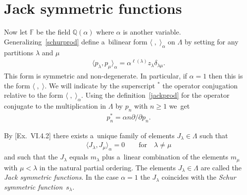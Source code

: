 \documentclass[pdftex]{sigma}
\numberwithin{equation}{section}
\renewcommand\ge{\geqslant}
\begin{document}
\section{Jack symmetric functions}\label{Section5}

Now let $\mathbb F$ be the f\/ield $\mathbb Q(\alpha)$ where $\alpha$ is another variable.
Generalizing~\eqref{schurprod} def\/ine a~bilinear form $\langle\;,\;\rangle_\alpha$ on $\Lambda$
by setting for any partitions $\lambda$ and $\mu$
\begin{gather}
\label{jackprod}
\langle p_\lambda,p_\mu\rangle_\alpha=\alpha^{\ell(\lambda)}
z_\lambda\delta_{\lambda\mu}.
\end{gather}
This form is symmetric and non-degenerate.
In particular, if $\alpha=1$ then this is the form $\langle\;,\; \rangle$.
We will indicate by the superscript ${}^\ast$ the operator conjugation relative to the form
$\langle\;,\;\rangle_\alpha$.
Using the def\/inition~\eqref{jackprod} for the operator conjugate to the multiplication in $\Lambda$ by
$p_n$ with $n\ge1$ we~get
\begin{gather}
\label{pnast}
p_n^{\ast}=\alpha n\partial /\partial p_n.
\end{gather}

By [Ex.~VI.4.2] there exists a~unique family of elements $J_\lambda\in\Lambda$ such that
\begin{gather}
\label{plamu}
\langle J_\lambda,J_\mu\rangle_\alpha=0
\qquad
\text{for}
\quad
\lambda\neq\mu
\end{gather}
and such that the $J_\lambda$ equals $m_\lambda$ plus a~linear combination of the elements $m_\mu$ with
$\mu<\lambda$ in the natural partial ordering.
The elements $J_\lambda\in\Lambda$ are called the \textit{Jack symmetric functions}.
In the case $\alpha=1$ the $J_\lambda$ coincides with the \emph{Schur symmetric function}~$s_\lambda$.
\end{document}
